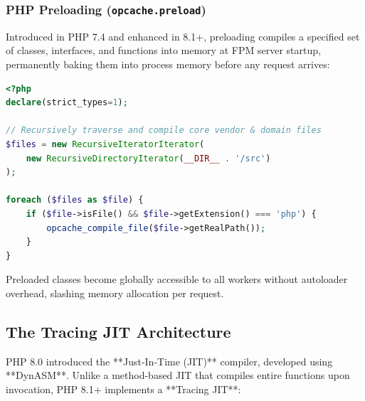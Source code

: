 \subsubsection{PHP Preloading (\texttt{opcache.preload})}
Introduced in PHP 7.4 and enhanced in 8.1+, preloading compiles a specified set of classes, interfaces, and functions into memory at FPM server startup, permanently baking them into process memory before any request arrives:

\begin{lstlisting}[language=PHP,caption={Production Preload Script (\texttt{preload.php})}]
<?php
declare(strict_types=1);

// Recursively traverse and compile core vendor & domain files
$files = new RecursiveIteratorIterator(
    new RecursiveDirectoryIterator(__DIR__ . '/src')
);

foreach ($files as $file) {
    if ($file->isFile() && $file->getExtension() === 'php') {
        opcache_compile_file($file->getRealPath());
    }
}
\end{lstlisting}

Preloaded classes become globally accessible to all workers without autoloader overhead, slashing memory allocation per request.

\subsection{The Tracing JIT Architecture}

PHP 8.0 introduced the **Just-In-Time (JIT)** compiler, developed using **DynASM**. Unlike a method-based JIT that compiles entire functions upon invocation, PHP 8.1+ implements a **Tracing JIT**:

